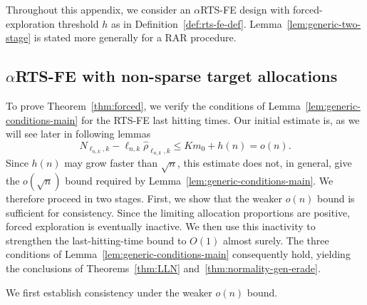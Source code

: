 {\color{revisiongreen}
{\color{green!35!black}Throughout this appendix, we consider an \(\alpha\)RTS-FE design with forced-exploration threshold \(h\) as in Definition~\ref{def:rts-fe-def}. Lemma~\ref{lem:generic-two-stage} is stated more generally for a RAR procedure.}

\subsection{\texorpdfstring{$\alpha$RTS-FE}{alpha RTS-FE} with non-sparse target allocations}\label{appnB:nonsparse}

{\color{revisiongreen}To prove Theorem~\ref{thm:forced}, we verify the conditions of Lemma~\ref{lem:generic-conditions-main} for the RTS-FE last hitting times. Our initial estimate is, as we will see later in following lemmas
\[
N_{\ell_{n,k},k}-\ell_{n,k}\hat\rho_{\ell_{n,k},k}
\leq Km_0+h(n)=o(n).
\]
Since \(h(n)\) may grow faster than \(\sqrt n\), this estimate does not, in general, give the \(o(\sqrt n)\) bound required by Lemma~\ref{lem:generic-conditions-main}. We therefore proceed in two stages. First, we show that the weaker \(o(n)\) bound is sufficient for consistency. Since the limiting allocation proportions are positive, forced exploration is eventually inactive. We then use this inactivity to strengthen the last-hitting-time bound to \(O(1)\) almost surely. The three conditions of Lemma~\ref{lem:generic-conditions-main} consequently hold, yielding the conclusions of Theorems~\ref{thm:LLN} and~\ref{thm:normality-gen-erade}.

We first establish consistency under the weaker \(o(n)\) bound.}

}
